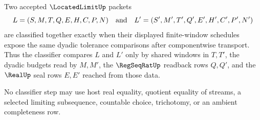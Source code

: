 \begin{definition}
\label{def:located-limit-classifier}
Two accepted $\LocatedLimitUp$ packets
$$
L=(S,M,T,Q,E,H,C,P,N)
\quad\hbox{and}\quad
L'=(S',M',T',Q',E',H',C',P',N')
$$
are classified together exactly when their displayed finite-window schedules expose the same dyadic tolerance comparisons after componentwise transport. Thus the classifier compares $L$ and $L'$ only by shared windows in $T,T'$, the dyadic budgets read by $M,M'$, the $\RegSeqRatUp$ readback rows $Q,Q'$, and the $\RealUp$ seal rows $E,E'$ reached from those data.

No classifier step may use host real equality, quotient equality of streams, a selected limiting subsequence, countable choice, trichotomy, or an ambient completeness row.
\end{definition}

